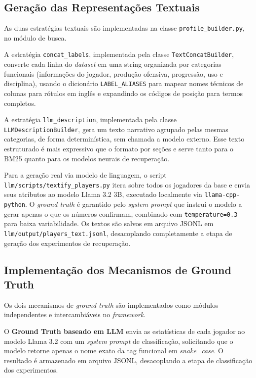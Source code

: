 \documentclass[portuguese]{sbc2025}
\begin{document}
\subsection{Geração das Representações Textuais}

As duas estratégias textuais são implementadas na classe \texttt{profile\_builder.py},
no módulo de busca.

A estratégia \texttt{concat\_labels}, implementada pela classe
\texttt{TextConcatBuilder}, converte cada linha do \textit{dataset} em uma string
organizada por categorias funcionais (informações do jogador, produção ofensiva,
progressão, uso e disciplina), usando o dicionário \texttt{LABEL\_ALIASES} para
mapear nomes técnicos de colunas para rótulos em inglês e expandindo os códigos de
posição para termos completos.

A estratégia \texttt{llm\_description}, implementada pela classe
\texttt{LLMDescriptionBuilder}, gera um texto narrativo agrupado pelas mesmas
categorias, de forma determinística, sem chamada a modelo externo. Esse texto
estruturado é mais expressivo que o formato por seções e serve tanto para o BM25
quanto para os modelos neurais de recuperação.

Para a geração real via modelo de linguagem, o script
\texttt{llm/scripts/textify\_players.py} itera sobre todos os jogadores da base e
envia seus atributos ao modelo Llama 3.2 3B, executado localmente via
\texttt{llama-cpp-python}. O \textit{ground truth} é garantido pelo \textit{system
prompt} que instrui o modelo a gerar apenas o que os números confirmam, combinado com
\texttt{temperature=0.3} para baixa variabilidade. Os textos são salvos em arquivo
JSONL em \texttt{llm/output/players\_text.jsonl}, desacoplando completamente a etapa
de geração dos experimentos de recuperação.

\subsection{Implementação dos Mecanismos de Ground Truth}

Os dois mecanismos de \textit{ground truth} são implementados como módulos
independentes e intercambiáveis no \textit{framework}.

O \textbf{Ground Truth baseado em LLM} envia as estatísticas de cada jogador ao
modelo Llama 3.2 com um \textit{system prompt} de classificação, solicitando que o
modelo retorne apenas o nome exato da tag funcional em \textit{snake\_case}. O
resultado é armazenado em arquivo JSONL, desacoplando a etapa de classificação dos
experimentos.
\end{document}
